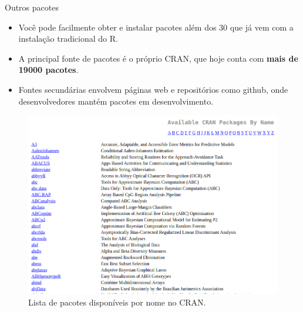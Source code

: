 \documentclass[
  ignorenonframetext,
  serif,
  professionalfont,
  usenames,
  dvipsnames,
  aspectratio = 169]{beamer}
\providecommand{\tightlist}{%
  \setlength{\itemsep}{0pt}\setlength{\parskip}{0pt}}
\renewcommand{\tightlist}{%
  \setlength{\itemsep}{0\baselineskip}
  \setlength{\parskip}{0.25\baselineskip}
}
\def\beginAHalfColumn{\begin{minipage}{0.49\textwidth}}%
\def\endColumns{\end{minipage}}%
\begin{document}
\begin{frame}{Outros pacotes}
\label{outros-pacotes}
\beginAHalfColumn

\begin{itemize}
\tightlist
\item
  Você pode facilmente obter e instalar pacotes além dos 30 que já vem
  com a instalação tradicional do R.
\end{itemize}

\vspace{0.3cm}

\begin{itemize}
\tightlist
\item
  A principal fonte de pacotes é o próprio CRAN, que hoje conta com
  \textbf{mais de 19000 pacotes}.
\end{itemize}

\vspace{0.3cm}

\begin{itemize}
\tightlist
\item
  Fontes secundárias envolvem páginas web e repositórios como github,
  onde desenvolvedores mantém pacotes em desenvolvimento.
\end{itemize}

\endColumns
\beginAHalfColumn

\begin{figure}

{\centering \includegraphics[width=0.9\linewidth]{./img/list-packages} 

}

\caption{Lista de pacotes disponíveis por nome no CRAN.}\label{fig:unnamed-chunk-7}
\end{figure}

\endColumns
\end{frame}
\end{document}
